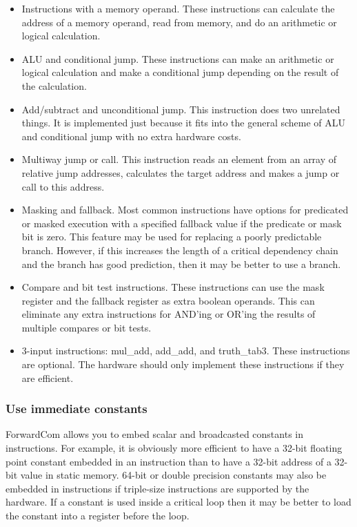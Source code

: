 \documentclass[forwardcom.tex]{subfiles}
\begin{document}
\begin{itemize}
\item Instructions with a memory operand. These instructions can calculate the address of a memory operand, read from memory, and do an arithmetic or logical calculation.

\item ALU and conditional jump. These instructions can make an arithmetic or logical calculation and make a conditional jump depending on the result of the calculation.

\item Add/subtract and unconditional jump. This instruction does two unrelated things. It is implemented just because it fits into the general scheme of ALU and conditional jump with no extra hardware costs.

\item Multiway jump or call. This instruction reads an element from an array of relative jump addresses, calculates the target address and makes a jump or call to this address.

\item Masking and fallback. Most common instructions have options for predicated or masked execution with a specified fallback value if the predicate or mask bit is zero. This feature may be used for replacing a poorly predictable branch. However, if this increases the length of a critical dependency chain and the branch has good prediction, then it may be better to use a branch.

\item Compare and bit test instructions. These instructions can use the mask register and the fallback register as extra boolean operands. This can eliminate any extra instructions for AND'ing or OR'ing the results of multiple compares or bit tests.

\item 3-input instructions: mul\_add, add\_add, and truth\_tab3. These instructions are optional. The hardware should only implement these instructions if they are efficient.

\end{itemize}

\subsubsection{Use immediate constants}
ForwardCom allows you to embed scalar and broadcasted constants in instructions. For example, it is obviously more efficient to have a 32-bit floating point constant embedded in an instruction than to have a 32-bit address of a 32-bit value in static memory. 64-bit or double precision constants may also be embedded in instructions if triple-size instructions are supported by the hardware. If a constant is used inside a critical loop then it may be better to load the constant into a register before the loop.
\end{document}
